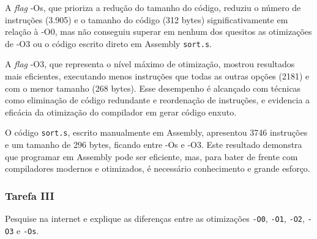 \documentclass[a4paper,12pt]{article}
\newcommand{\cod}[1]{\texttt{#1}}
\begin{document}
A \textit{flag} -Os, que prioriza a redução do tamanho do código, reduziu o número de instruções (3.905) e o tamanho do código (312 bytes) significativamente em relação à -O0, mas não conseguiu superar em nenhum dos quesitos as otimizações de -O3 ou o código escrito direto em Assembly \cod{sort.s}. 

A \textit{flag} -O3, que representa o nível máximo de otimização, mostrou resultados mais eficientes, executando menos instruções que todas as outras opções (2181) e com o menor tamanho (268 bytes). Esse desempenho é alcançado com técnicas como eliminação de código redundante e reordenação de instruções, e evidencia a eficácia da otimização do compilador em gerar código enxuto.

O código \cod{sort.s}, escrito manualmente em Assembly, apresentou 3746 instruções e um tamanho de 296 bytes, ficando entre -Os e -O3. Este resultado demonstra que programar em Assembly pode ser eficiente, mas, para bater de frente com compiladores modernos e otimizados, é necessário conhecimento e grande esforço.

\subsubsection{Tarefa III}
\begin{tcolorbox}[title=Enunciado, colback=blue!5!white, colframe=blue!75!black]
Pesquise na internet e explique as diferenças entre as otimizações \cod{-O0}, \cod{-O1}, \cod{-O2}, \cod{-O3} e \cod{-Os}.  
\end{tcolorbox}
\end{document}
